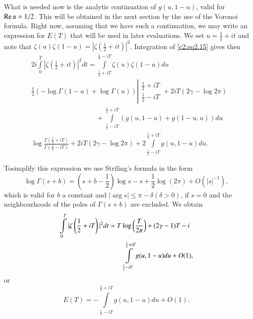 What is needed now is the analytic continuation of $g(u, 1- u)$, valid
for $\operatorname{Re} u = 1/2$. This will be obtained in the next section by the
use of the Voronoi formula. Right now, assuming that we have such a
continuation, we may write an expression for $E(T)$ that will be used
in later evaluations. We set $u = \frac{1}{2} + it$ and note that
$\zeta (u) \zeta (1-u)= |\zeta (\frac{1}{2} + it)|^2$. Integration of
\eqref{c2:eq2.15} gives then
\begin{align*}
  & 2 i \int\limits^T_0 |\zeta (\frac{1}{2} + it )|^2 dt =
  \int\limits^{\frac{1}{2} - iT}_{\frac{1}{2} + iT} \zeta (u) \zeta
  (1-u) du\\
  & \frac{1}{2} (- \log \Gamma (1- u)+ \log \Gamma (u))
  \left| \begin{matrix}
    \frac{1}{2} + iT\\[5pt]
    \frac{1}{2} - iT
  \end{matrix}\right. + 2 iT ( 2\gamma - \log 2 \pi)\\
  & \hspace{4cm}+ \int\limits^{\frac{1}{2} + iT}_{\frac{1}{2} - iT} (g (u, 1- u)
  + g(1- u, u)) du\\
  & \log \frac{\Gamma (\frac{1}{2} + i T)}{\Gamma (\frac{1}{2} - iT)}
  + 2 i T (2 \gamma - \log 2 \pi) + 2 \int\limits^{\frac{1}{2} +
    iT}_{\frac{1}{2} - iT} g (u, 1- u) du.
\end{align*}

To\pageoriginale simplify this expression we use Striling's formula in the form
\begin{equation}
  \log \Gamma (s+b) = \left(s+b - \frac{1}{2}\right) \log s -s +
  \frac{1}{2} \log (2 \pi) + O (|s|^{-1}),\label{c2:eq2.17}
\end{equation}
which is valid for $b$ a constant and $|\arg s| \leq \pi - \delta
(\delta > 0)$, if $s=0$ and the neighbourhoods of the poles of $\Gamma
(s+b)$ are excluded. We obtain
\begin{align}
  \int\limits^T_0 |\zeta \left(\frac{1}{2} + iT\right)|^2 dt &= T \log
  \left(\frac{T}{2 \pi} \right) + (2 \gamma -1) T - i\notag\\
  &\qquad\int\limits^{\frac{1}{2} + iT}_{\frac{1}{2} - iT} g (u, 1 -u) du + O
  (1), \label{c2:eq2.18}
\end{align}
or
\begin{equation}
  E(T) = - \int\limits^{\frac{1}{2} + iT}_{\frac{1}{2} - iT} g(u, 1
  -u) du + O(1).\label{c2:eq2.19}
\end{equation}

